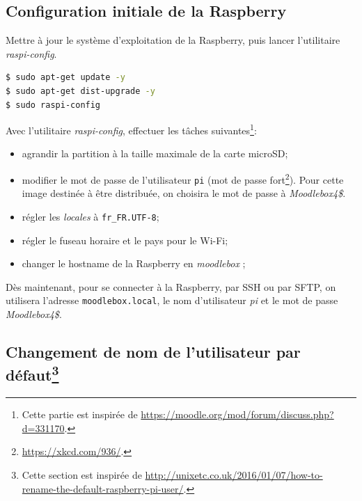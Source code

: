 \documentclass[11pt]{article}
\begin{document}
\subsection{Configuration initiale de la Raspberry}

Mettre à jour le système d'exploitation de la Raspberry, puis lancer l'utilitaire \emph{raspi-config}.

\begin{lstlisting}[language=bash]
$ sudo apt-get update -y
$ sudo apt-get dist-upgrade -y
$ sudo raspi-config
\end{lstlisting}

Avec l'utilitaire \emph{raspi-config}, effectuer les tâches suivantes\footnote{Cette partie est inspirée de \url{https://moodle.org/mod/forum/discuss.php?d=331170}.}:
\begin{itemize}
\item agrandir la partition à la taille maximale de la carte microSD;
\item modifier le mot de passe de l'utilisateur \lstinline{pi} (mot de passe fort\footnote{\url{https://xkcd.com/936/}.}). Pour cette image destinée à être distribuée, on choisira le mot de passe à \emph{Moodlebox4\$}.
\item régler les \emph{locales} à \lstinline{fr_FR.UTF-8};
\item régler le fuseau horaire et le pays pour le Wi-Fi;
\item changer le hostname de la Raspberry en \emph{moodlebox} ;
\end{itemize}

Dès maintenant, pour se connecter à la Raspberry, par SSH ou par SFTP, on utilisera l'adresse \lstinline{moodlebox.local}, le nom d'utilisateur \emph{pi} et le mot de passe \emph{Moodlebox4\$}.

\subsection[Changement de nom de l'utilisateur par défaut]{Changement de nom de l'utilisateur par défaut\footnote{Cette section est inspirée de \url{http://unixetc.co.uk/2016/01/07/how-to-rename-the-default-raspberry-pi-user/}.}}
\end{document}
